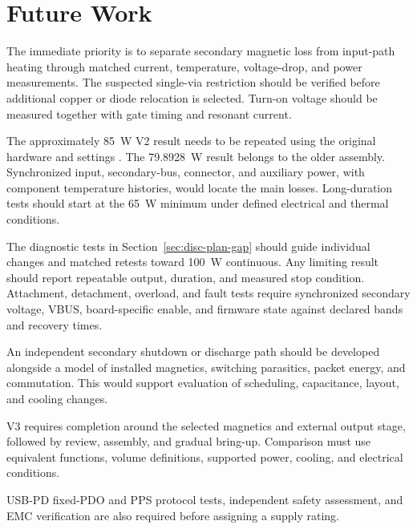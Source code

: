 \section{Future Work}
\label{sec:concl-future}

The immediate priority is to separate secondary magnetic loss from
input-path heating through matched current, temperature, voltage-drop,
and power measurements. The suspected single-via restriction should be
verified before additional copper or diode relocation is selected.
Turn-on voltage should be measured together with gate timing and resonant current.

The approximately \SI{85}{\watt} V2 result needs to be repeated using the
original hardware and settings \cite{projectOctoberPlan}.
The \SI{79.8928}{\watt} result belongs to the older assembly.
Synchronized input, secondary-bus, connector, and auxiliary power,
with component temperature histories, would locate the main losses.
Long-duration tests should start at the \SI{65}{\watt} minimum under
defined electrical and thermal conditions.

The diagnostic tests in Section~\ref{sec:disc-plan-gap} should guide
individual changes and matched retests toward \SI{100}{\watt}
continuous. Any limiting result should report repeatable output, duration,
and measured stop condition. Attachment, detachment, overload, and fault
tests require synchronized secondary voltage, VBUS, board-specific enable,
and firmware state against declared bands and recovery times.

An independent secondary shutdown or discharge path should be developed
alongside a model of installed magnetics, switching parasitics, packet
energy, and commutation. This would support evaluation of scheduling,
capacitance, layout, and cooling changes.

V3 requires completion around the selected magnetics and external output
stage, followed by review, assembly, and gradual bring-up. Comparison must
use equivalent functions, volume definitions, supported power, cooling,
and electrical conditions.

USB-PD fixed-PDO and PPS protocol tests, independent safety assessment,
and EMC verification are also required before assigning a supply rating.
